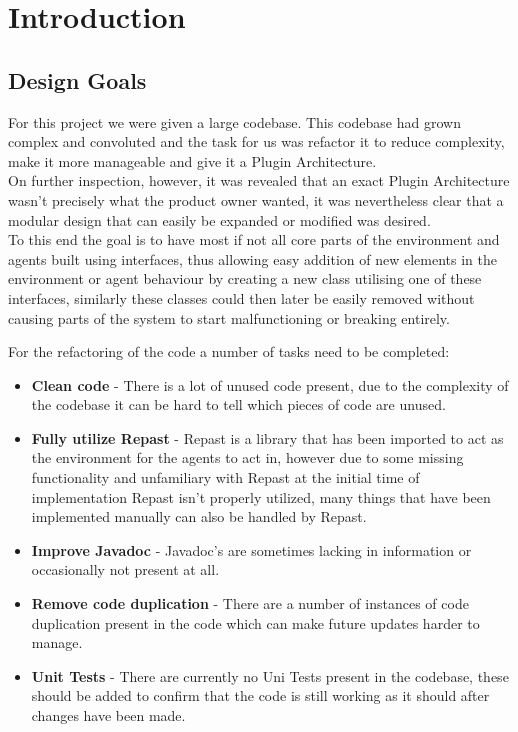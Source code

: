 \chapter{Introduction}
\section{Design Goals}
For this project we were given a large codebase. This codebase had grown complex and convoluted and the task for us was refactor it to reduce complexity, make it more manageable and give it a Plugin Architecture. \\
On further inspection, however, it was revealed that an exact Plugin Architecture wasn't precisely what the product owner wanted, it was nevertheless clear that a modular design that can easily be expanded or modified was desired. \\
To this end the goal is to have most if not all core parts of the environment and agents built using interfaces, thus allowing easy addition of new elements in the environment or agent behaviour by creating a new class utilising one of these interfaces, similarly these classes could then later be easily removed without causing parts of the system to start malfunctioning or breaking entirely.

For the refactoring of the code a number of tasks need to be completed:
\begin{itemize}
\item
\textbf{Clean code} - There is a lot of unused code present, due to the complexity of the codebase it can be hard to tell which pieces of code are unused.
\item
\textbf{Fully utilize Repast} - Repast is a library that has been imported to act as the environment for the agents to act in, however due to some missing functionality and unfamiliary with Repast at the initial time of implementation Repast isn't properly utilized, many things that have been implemented manually can also be handled by Repast.
\item
\textbf{Improve Javadoc} - Javadoc's are sometimes lacking in information or occasionally not present at all.
\item
\textbf{Remove code duplication} - There are a number of instances of code duplication present in the code which can make future updates harder to manage.
\item
\textbf{Unit Tests} - There are currently no Uni Tests present in the codebase, these should be added to confirm that the code is still working as it should after changes have been made.
\end{itemize}